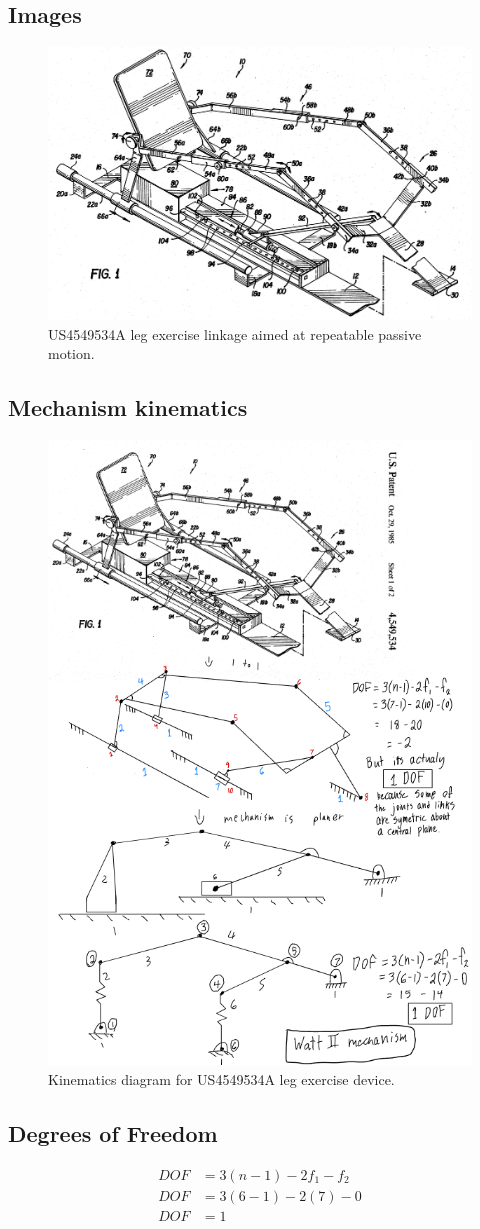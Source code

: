 \documentclass[11pt]{article}
\begin{document}
\subsection{Images}
\begin{figure}[H]
  \centering
  \includegraphics[width=0.54\linewidth]{US4549534.png}
  \caption{US4549534A leg exercise linkage aimed at repeatable passive motion.}
  \label{fig:US4549534A}
\end{figure}

\subsection{Mechanism kinematics}
\begin{figure}[H]
  \centering
  \includegraphics[width=0.54\linewidth]{../Kinematic Mechanism Images/4549534.png}
  \caption{Kinematics diagram for US4549534A leg exercise device.}
  \label{fig:US4549534A_kinematics}
\end{figure}

\subsection{Degrees of Freedom}
\[
\begin{aligned}
DOF &= 3(n-1) - 2f_1 - f_2 \\
DOF &= 3(6-1) - 2(7) - 0 \\
DOF &= 1
\end{aligned}
\]
\end{document}
